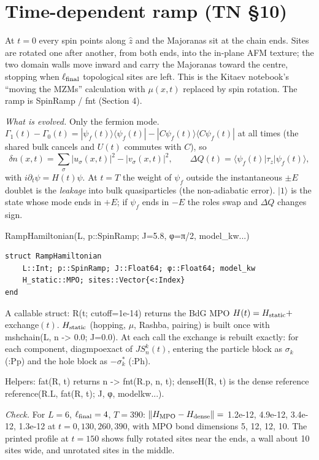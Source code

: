 \documentclass[11pt]{article}
\newcommand{\codeus}{\textunderscore\allowbreak}
\renewcommand{\code}[1]{{\ttfamily\let\_\codeus #1}}
\begin{document}
\section{Time-dependent ramp (TN §10)}

At $t=0$ every spin points along $\hat z$ and the Majoranas sit at the chain ends. Sites are rotated one after another, from both ends, into the in-plane AFM texture; the two domain walls move inward and carry the Majoranas toward the centre, stopping when $\ell_{\rm final}$ topological sites are left. This is the Kitaev notebook's ``moving the MZMs'' calculation with $\mu(x,t)$ replaced by spin rotation. The ramp is \code{SpinRamp} / \code{f\_nt} (Section 4).

\emph{What is evolved.} Only the fermion mode. $\Gamma_1(t)-\Gamma_0(t)=|\psi_f(t)\rangle\langle\psi_f(t)|-|C\psi_f(t)\rangle\langle C\psi_f(t)|$ at all times (the shared bulk cancels and $U(t)$ commutes with $C$), so
\[
\delta n(x,t)=\sum_\sigma|u_\sigma(x,t)|^2-|v_\sigma(x,t)|^2,\qquad\Delta Q(t)=\langle\psi_f(t)|\tau_z|\psi_f(t)\rangle,
\]
with $i\partial_t\psi=H(t)\psi$. At $t=T$ the weight of $\psi_f$ outside the instantaneous $\pm E$ doublet is the \emph{leakage} into bulk quasiparticles (the non-adiabatic error). $|1\rangle$ is the state whose mode ends in $+E$; if $\psi_f$ ends in $-E$ the roles swap and $\Delta Q$ changes sign.

\begin{function}{RampHamiltonian(L, p::SpinRamp; J=5.8, φ=π/2, model\_kw...)}
\begin{Verbatim}
struct RampHamiltonian
    L::Int; p::SpinRamp; J::Float64; φ::Float64; model_kw
    H_static::MPO; sites::Vector{<:Index}
end
\end{Verbatim}
A callable struct: \code{R(t; cutoff=1e-14)} returns the BdG MPO $H(t)=H_{\rm static}+$ exchange$(t)$. $H_{\rm static}$ (hopping, $\mu$, Rashba, pairing) is built once with \code{msh\_chain(L, n -> 0.0; J=0.0)}. At each call the exchange is rebuilt exactly: for each component, \code{diag\_mpo\_exact} of $J S_n^k(t)$, entering the particle block as $\sigma_k$ (\code{:Pp}) and the hole block as $-\sigma_k^*$ (\code{:Ph}).

Helpers: \code{f\_at(R, t)} returns \code{n -> f\_nt(R.p, n, t)}; \code{dense\_H(R, t)} is the dense reference \code{reference(R.L, f\_at(R, t); J, φ, model\_kw...)}.

\emph{Check.} For $L=6$, $\ell_{\rm final}=4$, $T=390$: $\|H_{\rm MPO}-H_{\rm dense}\|=$ 1.2e-12, 4.9e-12, 3.4e-12, 1.3e-12 at $t=0,130,260,390$, with MPO bond dimensions 5, 12, 12, 10. The printed profile at $t=150$ shows fully rotated sites near the ends, a wall about 10 sites wide, and unrotated sites in the middle.
\end{function}
\end{document}
